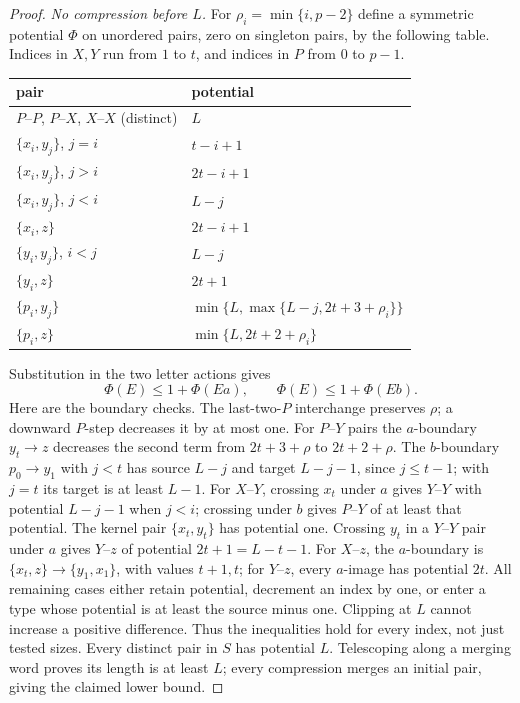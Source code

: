 \documentclass[10pt]{article}
\begin{document}
\begin{proof}
\emph{No compression before $L$.}
For $\rho_i=\min\{i,p-2\}$ define a symmetric potential $\Phi$ on unordered
pairs, zero on singleton pairs, by the following table. Indices in $X,Y$
run from $1$ to $t$, and indices in $P$ from $0$ to $p-1$.
\begin{center}\small
\begin{tabular}{ll}
pair&potential\\ \hline
$P$--$P$, $P$--$X$, $X$--$X$ (distinct)&$L$\\
$\{x_i,y_j\}$, $j=i$&$t-i+1$\\
$\{x_i,y_j\}$, $j>i$&$2t-i+1$\\
$\{x_i,y_j\}$, $j<i$&$L-j$\\
$\{x_i,z\}$&$2t-i+1$\\
$\{y_i,y_j\}$, $i<j$&$L-j$\\
$\{y_i,z\}$&$2t+1$\\
$\{p_i,y_j\}$&$\min\{L,\max\{L-j,2t+3+\rho_i\}\}$\\
$\{p_i,z\}$&$\min\{L,2t+2+\rho_i\}$
\end{tabular}
\end{center}
Substitution in the two letter actions gives
\[
 \Phi(E)\le1+\Phi(Ea),\qquad \Phi(E)\le1+\Phi(Eb).
\]
Here are the boundary checks. The last-two-$P$ interchange preserves $\rho$;
a downward $P$-step decreases it by at most one.
For $P$--$Y$ pairs the $a$-boundary $y_t\to z$ decreases the second term
from $2t+3+\rho$ to $2t+2+\rho$.
The $b$-boundary $p_0\to y_1$ with $j<t$ has source $L-j$
and target $L-j-1$, since $j\le t-1$; with $j=t$ its target is at least $L-1$.
For $X$--$Y$, crossing $x_t$ under $a$ gives $Y$--$Y$ with potential $L-j-1$
when $j<i$; crossing under $b$ gives $P$--$Y$ of at least that potential.
The kernel pair $\{x_t,y_t\}$ has potential one.
Crossing $y_t$ in a $Y$--$Y$ pair under $a$ gives $Y$--$z$ of
potential $2t+1=L-t-1$.
For $X$--$z$, the $a$-boundary is $\{x_t,z\}\to\{y_1,x_1\}$,
with values $t+1,t$; for $Y$--$z$, every $a$-image has potential $2t$.
All remaining cases either retain potential, decrement an index by one,
or enter a type whose potential is at least the source minus one.
Clipping at $L$ cannot increase a positive difference.
Thus the inequalities hold for every index, not just tested sizes.
Every distinct pair in $S$ has potential $L$.
Telescoping along a merging word proves its length is at least $L$;
every compression merges an initial pair, giving the claimed lower bound.


\end{proof}
\end{document}
